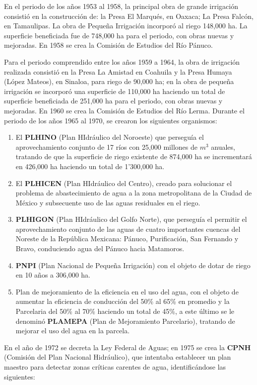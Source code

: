 En el periodo de los años 1953 al 1958, la principal obra de grande irrigación consistió en la construcción de: la Presa El Marqués, en Oaxaca; La Presa Falcón, en Tamaulipas. La obra de Pequeña Irrigación incorporó al riego 148,000 ha. La superficie beneficiada fue de 748,000 ha para el periodo, con obras nuevas y mejoradas. En 1958 se crea la Comisión de Estudios del Río Pánuco.

Para el periodo comprendido entre los años 1959 a 1964, la obra de irrigación realizada consistió en la Presa La Amistad en Coahuila y la Presa Humaya (López Mateos), en Sinaloa, para riego de 90,000 ha; en la obra de pequeña irrigación se incorporó una superficie de 110,000 ha haciendo un total de superficie beneficiada de 251,000 ha para el periodo, con obras nuevas y mejoradas. En 1960 se crea la Comisión de Estudios del Río Lerma. Durante el periodo de los años 1965 al 1970, se crearon los siguientes organismos:
\begin{enumerate}
	\item El \textbf{PLHINO} (Plan HIdráulico del Noroeste) que perseguía el aprovechamiento conjunto de 17 ríos con 25,000 millones de $m^3$ anuales, tratando de que la superficie de riego existente de 874,000 ha se incrementará en 426,000 ha haciendo un total de 1’300,000 ha.
	\item El \textbf{PLHICEN} (Plan HIdráulico del Centro), creado para solucionar el problema de abastecimiento de agua a la zona metropolitana de la Ciudad de México y subsecuente uso de las aguas residuales en el riego.
	\item \textbf{PLHIGON} (Plan HIdráulico del Golfo Norte), que perseguía el permitir el aprovechamiento conjunto de las aguas de cuatro importantes cuencas del Noreste de la República Mexicana: Pánuco, Purificación, San Fernando y Bravo, conduciendo agua del Pánuco hacia Matamoros.
	\item \textbf{PNPI} (Plan Nacional de Pequeña Irrigación) con el objeto de dotar de riego en 10 años a 306,000 ha.
	\item  Plan de mejoramiento de la eficiencia en el uso del agua, con el objeto de aumentar la eficiencia de conducción del 50\% al 65\% en promedio y la Parcelaria del 50\% al 70\% haciendo un total de 45\%, a este último se le denominó \textbf{PLAMEPA} (Plan de Mejoramiento Parcelario), tratando de mejorar el uso del agua en la parcela.
\end{enumerate}
En el año de 1972 se decreta la Ley Federal de Aguas; en 1975 se crea la \textbf{CPNH} (Comisión del Plan Nacional Hidráulico), que intentaba establecer un plan maestro para detectar zonas críticas carentes de agua, identificándose las siguientes:
